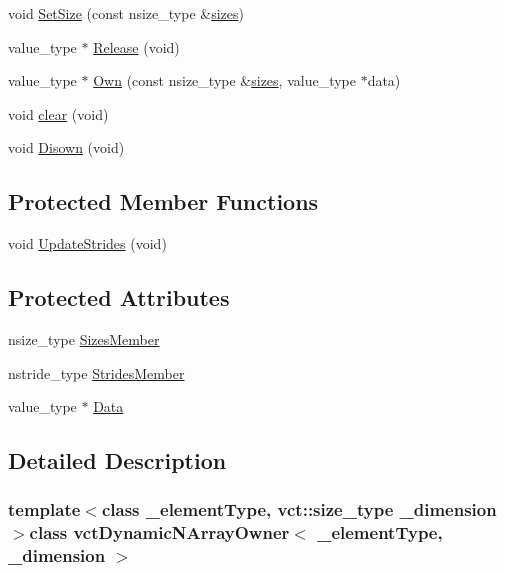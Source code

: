 \begin{DoxyCompactItemize}
\item 
void \hyperlink{classvct_dynamic_n_array_owner_ad3018a162b6670166cb3f2962c205fb2}{Set\+Size} (const nsize\+\_\+type \&\hyperlink{classvct_dynamic_n_array_owner_a014679026d1c8b3c3f07170c58ece520}{sizes})
\item 
value\+\_\+type $\ast$ \hyperlink{classvct_dynamic_n_array_owner_a7fe967c37e7e574c5756043b54780231}{Release} (void)
\item 
value\+\_\+type $\ast$ \hyperlink{classvct_dynamic_n_array_owner_a352c3d4945571ee24a82156cc0c412a3}{Own} (const nsize\+\_\+type \&\hyperlink{classvct_dynamic_n_array_owner_a014679026d1c8b3c3f07170c58ece520}{sizes}, value\+\_\+type $\ast$data)
\item 
void \hyperlink{classvct_dynamic_n_array_owner_af9a8488a90e75a1a4a56a6515b646f6c}{clear} (void)
\item 
void \hyperlink{classvct_dynamic_n_array_owner_af638b7b4d0a7423363f5a026ec9bd0ca}{Disown} (void)
\end{DoxyCompactItemize}
\subsection*{Protected Member Functions}
\begin{DoxyCompactItemize}
\item 
void \hyperlink{classvct_dynamic_n_array_owner_a07a905156b3ed0bc51ef9ec4547a32f8}{Update\+Strides} (void)
\end{DoxyCompactItemize}
\subsection*{Protected Attributes}
\begin{DoxyCompactItemize}
\item 
nsize\+\_\+type \hyperlink{classvct_dynamic_n_array_owner_af107a6047ac88e19634d12fbd93e6267}{Sizes\+Member}
\item 
nstride\+\_\+type \hyperlink{classvct_dynamic_n_array_owner_a7a9e21f0f52c3ca29da81f404eaaafcb}{Strides\+Member}
\item 
value\+\_\+type $\ast$ \hyperlink{classvct_dynamic_n_array_owner_a8b99109f919dd5b01605368e2eb06ca4}{Data}
\end{DoxyCompactItemize}


\subsection{Detailed Description}
\subsubsection*{template$<$class \+\_\+element\+Type, vct\+::size\+\_\+type \+\_\+dimension$>$class vct\+Dynamic\+N\+Array\+Owner$<$ \+\_\+element\+Type, \+\_\+dimension $>$}


